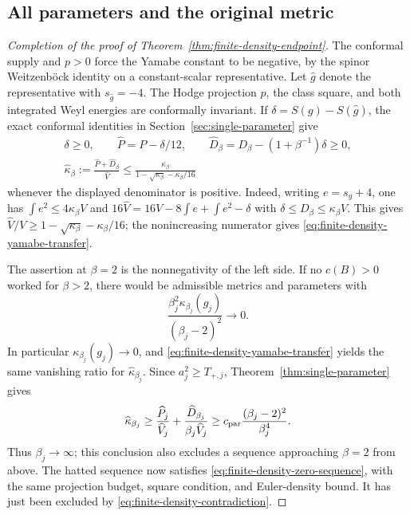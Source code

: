 \subsection{All parameters and the original metric}

\begin{proof}[Completion of the proof of
Theorem~\ref{thm:finite-density-endpoint}]
The conformal supply and $p>0$ force the Yamabe constant to be
negative, by the spinor Weitzenb\"ock identity on a constant-scalar
representative.  Let $\widehat g$ denote the representative with
$s_{\widehat g}=-4$.  The Hodge projection $p$, the class square,
and both integrated Weyl energies are conformally invariant.  If
$\delta=S(g)-S(\widehat g)$, the exact conformal identities in
Section~\ref{sec:single-parameter} give
\begin{gather}
 \delta\ge0,\qquad
 \widehat P=P-\delta/12,\qquad
 \widehat D_\beta=D_\beta-(1+\beta^{-1})\delta\ge0,
 \label{eq:finite-density-conformal-identities}\\
 \widehat\kappa_\beta
       :=\frac{\widehat P+\widehat D_\beta}{\widehat V}
       \le\frac{\kappa_\beta}
        {1-\sqrt{\kappa_\beta}-\kappa_\beta/16}
 \label{eq:finite-density-yamabe-transfer}
\end{gather}
whenever the displayed denominator is positive.  Indeed, writing
$e=s_g+4$, one has $\int e^2\le4\kappa_\beta V$ and
$16\widehat V=16V-8\int e+\int e^2-\delta$ with
$\delta\le D_\beta\le\kappa_\beta V$.  This gives
$\widehat V/V\ge1-\sqrt{\kappa_\beta}-\kappa_\beta/16$;
the nonincreasing numerator gives
\eqref{eq:finite-density-yamabe-transfer}.

The assertion at $\beta=2$ is the nonnegativity of the left side.
If no $c(B)>0$ worked for $\beta>2$, there would be admissible
metrics and parameters with
\[
 \frac{\beta_j^2\kappa_{\beta_j}(g_j)}{(\beta_j-2)^2}
       \longrightarrow0.
\]
In particular $\kappa_{\beta_j}(g_j)\to0$, and
\eqref{eq:finite-density-yamabe-transfer} yields the same vanishing
ratio for $\widehat\kappa_{\beta_j}$.  Since $a_j^2\ge T_{+,j}$,
Theorem~\ref{thm:single-parameter} gives
\[
 \widehat\kappa_{\beta_j}\ge
 \frac{\widehat P_j}{\widehat V_j}
       +\frac{\widehat D_{\beta_j}}{\beta_j\widehat V_j}
 \ge c_{\rm par}\frac{(\beta_j-2)^2}{\beta_j^4}.
\]
Thus $\beta_j\to\infty$; this conclusion also excludes a sequence
approaching $\beta=2$ from above.  The hatted sequence now satisfies
\eqref{eq:finite-density-zero-sequence}, with the same projection
budget, square condition, and Euler-density bound.  It has just been
excluded by \eqref{eq:finite-density-contradiction}.
\end{proof}

